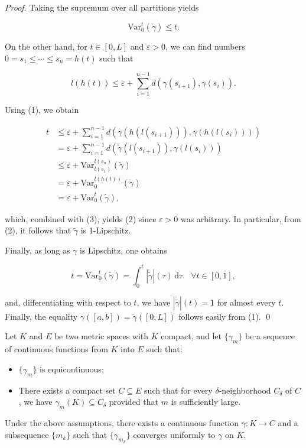 \documentclass[12pt]{article}
\begin{document}
{\begin{proof}
    Taking the supremum over all partitions yields

    \begin{equation}
        \mathrm{Var}_0^t(\tilde{\gamma}) \leqslant t. \tag{3}
    \end{equation}

    On the other hand, for $t \in [0, L]$ and $\varepsilon > 0$, we can find numbers
    $0 = s_1 \leqslant \cdots \leqslant s_n = h(t)$ such that

    \[
        l(h(t)) \leqslant \varepsilon + \sum_{i=1}^{n-1} d\!\left(\gamma(s_{i+1}), \gamma(s_i)\right).
    \]

    Using (1), we obtain

    \begin{align*}
        t &\leqslant \varepsilon + \sum_{i=1}^{n-1} d\!\left(\gamma(h(l(s_{i+1}))), \gamma(h(l(s_i)))\right) \\
          &= \varepsilon + \sum_{i=1}^{n-1} d\!\left(\tilde{\gamma}(l(s_{i+1})), \gamma(l(s_i))\right) \\
          &\leqslant \varepsilon + \mathrm{Var}_{l(s_1)}^{l(s_n)}(\tilde{\gamma}) \\
          &= \varepsilon + \mathrm{Var}_0^{l(h(t))}(\tilde{\gamma}) \\
          &= \varepsilon + \mathrm{Var}_0^t(\tilde{\gamma}),
    \end{align*}

    which, combined with (3), yields (2) since $\varepsilon > 0$ was arbitrary.
    In particular, from (2), it follows that $\tilde{\gamma}$ is 1-Lipschitz.

    Finally, as long as $\gamma$ is Lipschitz, one obtains

    \[
        t = \mathrm{Var}_0^t(\tilde{\gamma}) = \int_0^t |\dot{\tilde{\gamma}}|(\tau)\, \mathrm{d}\tau
        \quad \forall t \in [0, 1],
    \] 
    
    and, differentiating with respect to $t$, we have $|\dot{\tilde{\gamma}}|(t) = 1$ for almost
    every $t$. Finally, the equality $\gamma([a, b]) = \tilde{\gamma}([0, L])$ follows easily from
    (1). \qed \hfill\myqedsymbol

\end{proof}

\begin{theorem}
    Let $K$ and $E$ be two metric spaces with $K$ compact, and let $\{\gamma_m\}$ be a sequence of continuous functions from $K$ into $E$ such that:
    \begin{itemize}
        \item $\{\gamma_m\}$ is equicontinuous;
        \item There exists a compact set $C \subseteq E$ such that for every $\delta$-neighborhood $C_\delta$ of $C$, we have $\gamma_m(K) \subseteq C_\delta$ provided that $m$ is sufficiently large.
    \end{itemize}
   Under the above assumptions, there exists a continuous function $\gamma : K \to C$ and a subsequence $\{m_k\}$ such that $\{\gamma_{m_k}\}$ converges uniformly to $\gamma$ on $K$.
\end{theorem}

}
\end{document}
